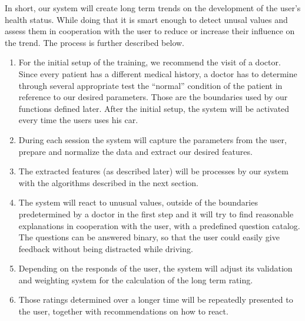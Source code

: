 In short, our system will create long term trends on the development of the user's health status. While doing that it is smart enough to detect unusal values and assess them in cooperation with the user to reduce or increase their influence on the trend.
The process is further described below.
\begin{enumerate}
	\item For the initial setup of the training, we recommend the visit of a doctor. Since every patient has a different medical history, a doctor has to determine through several appropriate test the ``normal'' condition of the patient in reference to our desired parameters. Those are the boundaries used by our functions defined later. After the initial setup, the system will be activated every time the users uses his car.
	\item During each session the system will capture the parameters from the user, prepare and normalize the data and extract our desired features.
	\item The extracted features (as described later) will be processes by our system with the algorithms described in the next section.
	\item The system will react to unusual values, outside of the boundaries predetermined by a doctor in the first step and it will try to find reasonable explanations in cooperation with the user, with a predefined question catalog. The questions can be answered binary, so that the user could easily give feedback without being distracted while driving. 
	\item Depending on the responds of the user, the system will adjust its validation and weighting system for the calculation of the long term rating.
	\item Those ratings determined over a longer time will be repeatedly presented to the user, together with recommendations on how to react.
\end{enumerate}

